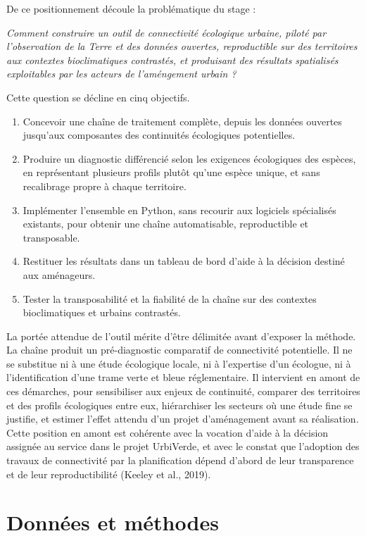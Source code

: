 \documentclass[a4paper,12pt]{report}
\begin{document}
De ce positionnement découle la problématique du stage :

\textit{Comment construire un outil de connectivité écologique urbaine, piloté par l'observation de la Terre et des données ouvertes, reproductible sur des territoires aux contextes bioclimatiques contrastés, et produisant des résultats spatialisés exploitables par les acteurs de l'améngement urbain ?}

Cette question se décline en cinq objectifs.

\begin{enumerate}
\item Concevoir une chaîne de traitement complète, depuis les données ouvertes jusqu'aux composantes des continuités écologiques potentielles.
\item Produire un diagnostic différencié selon les exigences écologiques des espèces, en représentant plusieurs profils plutôt qu'une espèce unique, et sans recalibrage propre à chaque territoire.
\item Implémenter l'ensemble en Python, sans recourir aux logiciels spécialisés existants, pour obtenir une chaîne automatisable, reproductible et transposable.
\item Restituer les résultats dans un tableau de bord d'aide à la décision destiné aux aménageurs.
\item Tester la transposabilité et la fiabilité de la chaîne sur des contextes bioclimatiques et urbains contrastés.
\end{enumerate}
La portée attendue de l'outil mérite d'être délimitée avant d'exposer la méthode. La chaîne produit un pré-diagnostic comparatif de connectivité potentielle. Il ne se substitue ni à une étude écologique locale, ni à l'expertise d'un écologue, ni à l'identification d'une trame verte et bleue réglementaire. Il intervient en amont de ces démarches, pour sensibiliser aux enjeux de continuité, comparer des territoires et des profils écologiques entre eux, hiérarchiser les secteurs où une étude fine se justifie, et estimer l'effet attendu d'un projet d'aménagement avant sa réalisation. Cette position en amont est cohérente avec la vocation d'aide à la décision assignée au service dans le projet UrbiVerde, et avec le constat que l'adoption des travaux de connectivité par la planification dépend d'abord de leur transparence et de leur reproductibilité (Keeley et al., 2019).

\chapter{Données et méthodes}
\end{document}
